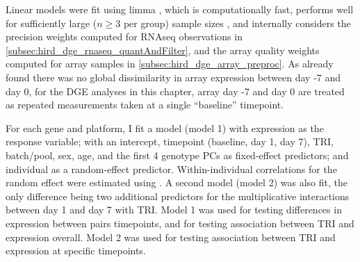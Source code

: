 Linear models were fit using limma \autocite{ritchie2015LimmaPowersDifferential}, 
which is computationally fast, 
performs well for sufficiently large ($n \ge 3$ per group) sample sizes \autocite{soneson2013ComparisonMethodsDifferential},
and internally considers the precision weights computed for \gls{RNAseq} observations in \cref{subsec:hird_dge_rnaseq_quantAndFilter},
and the array quality weights computed for array samples in \cref{subsec:hird_dge_array_preproc}.
As \textcite{sobolev2016AdjuvantedInfluenzaH1N1Vaccination} already found there was no global dissimilarity in array expression between day -7 and day 0,
for the \gls{DGE} analyses in this chapter, 
array day -7 and day 0 are treated as repeated measurements taken at a single \enquote{baseline} timepoint.

For each gene and platform, I fit a model (model 1) with expression as the response variable; 
with an intercept, timepoint (baseline, day 1, day 7), \gls{TRI}, batch/pool, sex, age, and the first 4 genotype \glspl{PC} as fixed-effect predictors;
and individual as a random-effect predictor.
Within-individual correlations for the random effect were estimated using .
A second model (model 2) was also fit, the only difference being two additional predictors for the multiplicative interactions between day 1 and day 7 with \gls{TRI}.
%
Model 1 was used for testing differences in expression between pairs timepoints, and for testing association between \gls{TRI} and expression overall.
Model 2 was used for testing association between \gls{TRI} and expression at specific timepoints.

